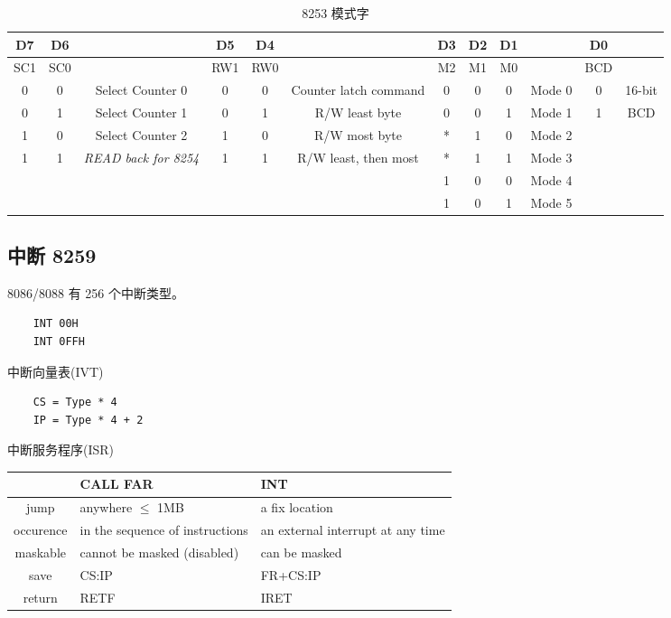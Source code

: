 \begin{table*}
\centering
\caption{8253 模式字}
\begin{tabular}{|c|c|c||c|c|c||c|c|c|c||c|c|}
	\hline
	D7 & D6 & & D5 & D4 & & D3 & D2 & D1 & & D0 & \\
	\hline
	SC1 & SC0 &  & RW1 & RW0 &  & M2 & M1 & M0 &  & BCD &  \\
	\hline
	0 & 0 & Select Counter 0 & 0 & 0 & Counter latch command & 0 & 0 & 0 & Mode 0 & 0 & 16-bit \\
	\hline
	0 & 1 & Select Counter 1 & 0 & 1 & R/W least byte & 0 & 0 & 1 & Mode 1 & 1 & BCD \\
	\hline
	1 & 0 & Select Counter 2 & 1 & 0 & R/W most byte & * & 1 & 0 & Mode 2 &  &  \\
	\hline
	1 & 1 & \textit{READ back for 8254 }& 1 & 1 & R/W least, then most & * & 1  & 1 & Mode 3 &  &  \\
	\hline
	&  &  &  &  &  & 1 & 0 & 0 & Mode 4 &  &  \\
	\hline
	&  &  &  &  &  & 1 & 0 & 1 & Mode 5 &  &  \\
	\hline
\end{tabular}
\end{table*}

\subsection{中断 8259}

8086/8088 有 256 个中断类型。
\begin{verbatim}
	INT 00H
	INT 0FFH
\end{verbatim}

中断向量表(IVT)
\begin{verbatim}
	CS = Type * 4
	IP = Type * 4 + 2
\end{verbatim}

中断服务程序(ISR)

\begin{table}[H]
	\begin{tabular}{|c|p{6em}|p{6em}|}
		\hline
		&\ttfamily CALL FAR &\ttfamily INT \\
		\hline
		jump & anywhere $\leq$ 1MB & a fix location \\
		\hline
		occurence & in the sequence of instructions & an external interrupt at any time \\
		\hline
		maskable & cannot be masked (disabled) & can be masked \\
		\hline
		save &\ttfamily CS:IP &\ttfamily FR+CS:IP \\
		\hline
		return  &\ttfamily RETF &\ttfamily IRET \\
		\hline
	\end{tabular}
\end{table}

